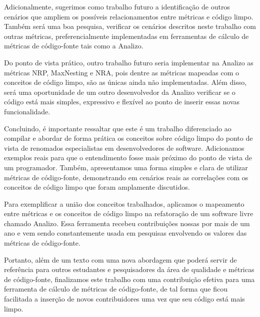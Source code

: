 Adicionalmente, sugerimos como trabalho futuro a identificação de outros cenários que ampliem os possíveis
relacionamentos entre métricas e código limpo. Também será uma boa pesquisa, verificar os cenários descritos neste 
trabalho com outras métricas, preferencialmente implementadas em ferramentas de cálculo de métricas
de código-fonte tais como a Analizo. 

Do ponto de vista prático, outro trabalho futuro seria implementar na Analizo as métricas NRP, MaxNesting e NRA,
pois dentre as métricas mapeadas com o conceitos de código limpo, são as únicas ainda não implementadas. Além 
disso, será uma oportunidade de um outro desenvolvedor da Analizo verificar se o código está mais simples, 
expressivo e flexível ao ponto de inserir essas novas funcionalidade.
 
Concluindo, é importante ressaltar que este é um trabalho diferenciado ao compilar e abordar de forma prática os
conceitos sobre código limpo do ponto de vista de renomados especialistas em desenvolvedores de software. 
Adicionamos exemplos reais para que o entendimento fosse mais próximo do ponto de vista de um programador.
Também, apresentamos uma forma simples e clara de utilizar métricas de código-fonte, demonstrando em 
cenários reais as correlações com os conceitos de código limpo que foram amplamente discutidos.

Para exemplificar a união dos conceitos trabalhados, aplicamos o mapeamento entre métricas e os conceitos de código limpo na 
refatoração de um software livre chamado Analizo. Essa ferramenta recebeu contribuições nossas por mais de um ano e vem sendo
constantemente usada em pesquisas envolvendo os valores das métricas de código-fonte.

Portanto, além de um texto com uma nova abordagem que poderá servir de referência para outros estudantes e 
pesquisadores da área de qualidade e métricas de código-fonte, finalizamos este trabalho com uma contribuição 
efetiva para uma ferramenta de cálculo de métricas de código-fonte, de tal forma que ficou facilitada
a inserção de novos contribuidores uma vez que seu código está mais limpo.
